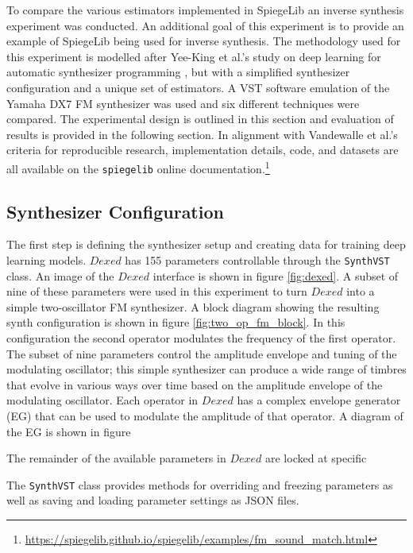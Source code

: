 To compare the various estimators implemented in SpiegeLib an inverse synthesis experiment was conducted. An additional goal of this experiment is to provide an example of SpiegeLib being used for inverse synthesis. The methodology used for this experiment is modelled after Yee-King et al.'s study on deep learning for automatic synthesizer programming \cite{yee2018automatic}, but with a simplified synthesizer configuration and a unique set of estimators. A VST software emulation of the Yamaha DX7 FM synthesizer was used and six different techniques were compared. The experimental design is outlined in this section and evaluation of results is provided in the following section. In alignment with Vandewalle et al.'s criteria for reproducible research, implementation details, code, and datasets are all available on the \texttt{spiegelib} online documentation.\footnote{\url{https://spiegelib.github.io/spiegelib/examples/fm_sound_match.html}}

\subsection{Synthesizer Configuration}
The first step is defining the synthesizer setup and creating data for training deep learning models. $Dexed$ has 155 parameters controllable through the \texttt{SynthVST} class. An image of the $Dexed$ interface is shown in figure \ref{fig:dexed}. A subset of nine of these parameters were used in this experiment to turn $Dexed$ into a simple two-oscillator FM synthesizer. A block diagram showing the resulting synth configuration is shown in figure \ref{fig:two_op_fm_block}. In this configuration the second operator modulates the frequency of the first operator. The subset of nine parameters control the amplitude envelope and tuning of the modulating oscillator; this simple synthesizer can produce a wide range of timbres that evolve in various ways over time based on the amplitude envelope of the modulating oscillator. Each operator in $Dexed$ has a complex envelope generator (EG) that can be used to modulate the amplitude of that operator. A diagram of the EG is shown in figure 

The remainder of the available parameters in $Dexed$ are locked at specific 

The \texttt{SynthVST} class provides methods for overriding and freezing parameters as well as saving and loading parameter settings as JSON files. 

